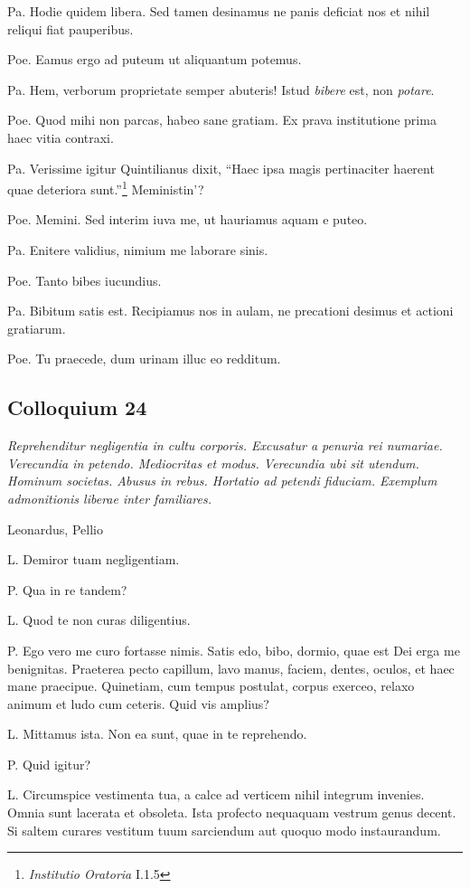 \documentclass{article}
\begin{document}
Pa. Hodie quidem libera. Sed tamen desinamus ne panis deficiat nos et nihil reliqui fiat pauperibus.

Poe. Eamus ergo ad puteum ut aliquantum potemus.

Pa. Hem, verborum proprietate semper abuteris! Istud \emph{bibere} est, non \emph{potare}.

Poe. Quod mihi non parcas, habeo sane gratiam. Ex prava institutione prima haec vitia contraxi.

Pa. Verissime igitur Quintilianus dixit, ``Haec ipsa magis pertinaciter haerent quae deteriora sunt.''\footnote{\emph{Institutio Oratoria} I.1.5} Meministin'?

Poe. Memini. Sed interim iuva me, ut hauriamus aquam e puteo.

Pa. Enitere validius, nimium me laborare sinis.

Poe. Tanto bibes iucundius.

Pa. Bibitum satis est. Recipiamus nos in aulam, ne precationi desimus et actioni gratiarum.

Poe. Tu praecede, dum urinam illuc eo redditum.

\subsection{Colloquium 24}
\emph{Reprehenditur negligentia in cultu corporis. Excusatur a penuria rei numariae. Verecundia in petendo. Mediocritas et modus. Verecundia ubi sit utendum. Hominum societas. Abusus in rebus. Hortatio ad petendi fiduciam. Exemplum admonitionis liberae inter familiares.}

Leonardus, Pellio

L. Demiror tuam negligentiam.

P. Qua in re tandem?

L. Quod te non curas diligentius.

P. Ego vero me curo fortasse nimis. Satis edo, bibo, dormio, quae est Dei erga me benignitas. Praeterea pecto capillum, lavo manus, faciem, dentes, oculos, et haec mane praecipue. Quinetiam, cum tempus postulat, corpus exerceo, relaxo animum et ludo cum ceteris. Quid vis amplius?

L. Mittamus ista. Non ea sunt, quae in te reprehendo.

P. Quid igitur?

L. Circumspice vestimenta tua, a calce ad verticem nihil integrum invenies. Omnia sunt lacerata et obsoleta. Ista profecto nequaquam vestrum genus decent. Si saltem curares vestitum tuum sarciendum aut quoquo modo instaurandum.
\end{document}
